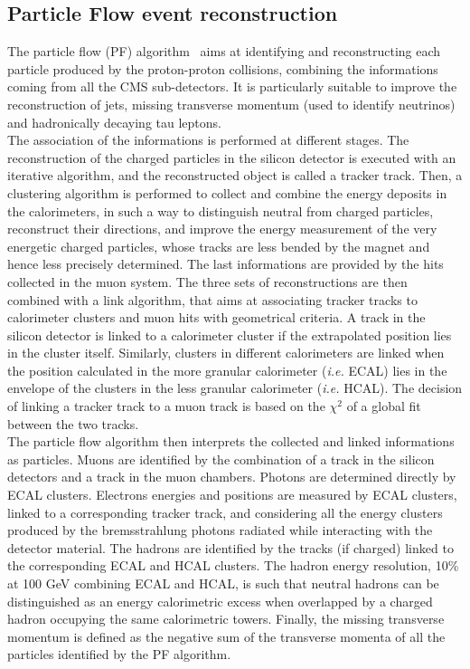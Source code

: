\subsection{Particle Flow event reconstruction}
The particle flow (PF) algorithm~\cite{Sirunyan:2270046} aims at identifying and reconstructing each particle produced by the proton-proton collisions, combining the informations coming from all the CMS sub-detectors. It is particularly suitable to improve the reconstruction of jets, missing transverse momentum (used to identify neutrinos) and hadronically decaying tau leptons.\\
The association of the informations is performed at different stages. The reconstruction of the charged particles in the silicon detector is executed with an iterative algorithm, and the reconstructed object is called a tracker track. Then, a clustering algorithm is performed to collect and combine the energy deposits in the calorimeters, in such a way to distinguish neutral from charged particles, reconstruct their directions, and improve the energy measurement of the very energetic charged particles, whose tracks are less bended by the magnet and hence less precisely determined. The last informations are provided by the hits collected in the muon system. The three sets of reconstructions are then combined with a link algorithm, that aims at associating tracker tracks to calorimeter clusters and muon hits with geometrical criteria. A track in the silicon detector is linked to a calorimeter cluster if the extrapolated position lies in the cluster itself. Similarly, clusters in different calorimeters are linked when the position calculated in the more granular calorimeter (\textit{i.e.} ECAL) lies in the envelope of the clusters in the less granular calorimeter (\textit{i.e.} HCAL). The decision of linking a tracker track to a muon track is based on the $\chi^2$ of a global fit between the two tracks.\\
The particle flow algorithm then interprets the collected and linked informations as particles. Muons are identified by the combination of a track in the silicon detectors and a track in the muon chambers. Photons are determined directly by ECAL clusters. Electrons energies and positions are measured by ECAL clusters, linked to a corresponding tracker track, and considering all the energy clusters produced by the bremsstrahlung photons radiated while interacting with the detector material. The hadrons are identified by the tracks (if charged) linked to the corresponding ECAL and HCAL clusters. The hadron energy resolution, 10\% at 100 GeV combining ECAL and HCAL, is such that neutral hadrons can be distinguished as an energy calorimetric excess when overlapped by a charged hadron occupying the same calorimetric towers. Finally, the missing transverse momentum is defined as the negative sum of the transverse momenta of all the particles identified by the PF algorithm.\\

